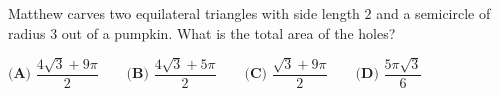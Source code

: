 Matthew carves two equilateral triangles with side length $2$ and a semicircle of radius $3$ out of a pumpkin. What is the total area of the holes?

$\textbf{(A) }\dfrac{4\sqrt3+9\pi}{2}\qquad\textbf{(B) }\dfrac{4\sqrt3+5\pi}{2}\qquad\textbf{(C) }\dfrac{\sqrt3+9\pi}{2}\qquad\textbf{(D) }\dfrac{5\pi\sqrt3}{6}$
